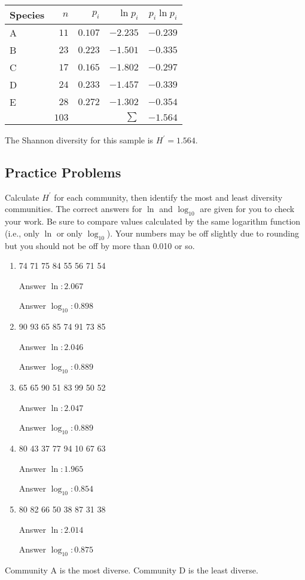 \documentclass[12pt]{exam}
\begin{document}
\begin{tabular}{lrrrr}
Species & $n$ & $p_i$ & $\ln p_i$ & $p_i \ln p_i$ \tabularnewline
\toprule
A & $11$ & $0.107$ & $-2.235$ & $-0.239$ \tabularnewline
B & $23$ & $0.223$ & $-1.501$ & $-0.335$ \tabularnewline
C & $17$ & $0.165$ & $-1.802$ & $-0.297$ \tabularnewline
D & $24$ & $0.233$ & $-1.457$ & $-0.339$ \tabularnewline
E & $28$ & $0.272$ & $-1.302$ & $-0.354$ \tabularnewline
\midrule
  &  $103$    &         & \hfill $\sum$ & $-1.564$\tabularnewline
\bottomrule
\end{tabular}

The Shannon diversity for this sample is $H^{\prime} = 1.564.$

\subsection*{Practice Problems}

Calculate $H^{\prime}$ for each community, then identify the most and least diversity communities.  The correct answers for $\ln$ and $\log_{10}$ are given for you to check your work. Be sure to compare values calculated by the same logarithm function (i.e., only $\ln$ or only $\log_{10}$). Your numbers may be off slightly due to rounding but you should not be off by more than 0.010 or so.

\begin{enumerate}[label=\textsc{Community \alph*:}]

\item 74 71 75 84 55 56 71 54

 Answer $\ln: 2.067$
 
 Answer $\log_{10}: 0.898$

\item 90 93 65 85 74 91 73 85

 Answer $\ln: 2.046$
 
 Answer $\log_{10}: 0.889$

\item 65 65 90 51 83 99 50 52

 Answer $\ln: 2.047$
 
 Answer $\log_{10}: 0.889$

\item 80 43 37 77 94 10 67 63

 Answer $\ln: 1.965$
 
 Answer $\log_{10}: 0.854$

\item 80 82 66 50 38 87 31 38

 Answer $\ln: 2.014$
 
 Answer $\log_{10}: 0.875$

\end{enumerate}

Community A is the most diverse. Community D is the least diverse.
\end{document}
